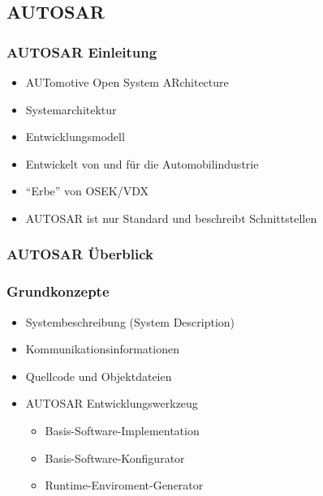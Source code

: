 \documentclass[]{beamer}
\newcommand{\inputImage}[1]{}
\begin{document}
\subsection{AUTOSAR}

\begin{frame}
\frametitle{AUTOSAR Einleitung}
    \begin{itemize}
        \item AUTomotive Open System ARchitecture
        \item Systemarchitektur
        \item Entwicklungsmodell
        \item Entwickelt von und für die Automobilindustrie
        \item "`Erbe"' von OSEK/VDX
        \item AUTOSAR ist nur Standard und beschreibt Schnittstellen
    \end{itemize}
\end{frame}

\begin{frame}[plain]
\frametitle{AUTOSAR Überblick}
    \begin{figure}[p]
        \centering
        \resizebox{0.64\linewidth}{!}{\inputImage{autosar_overview.dia}}
        \label{fig:autosar_overview}
    \end{figure}
\end{frame}

\begin{frame}
\frametitle{Grundkonzepte}
    \begin{itemize}
        \item Systembeschreibung (System Description)
        \item Kommunikationsinformationen
        \item Quellcode und Objektdateien
        \item AUTOSAR Entwicklungswerkzeug
        \begin{itemize}
            \item Basis-Software-Implementation
            \item Basis-Software-Konfigurator
            \item Runtime-Enviroment-Generator
        \end{itemize}
    \end{itemize}
\end{frame}


\end{document}
